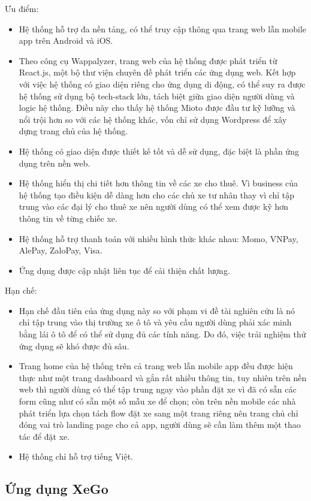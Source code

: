 \documentclass[../main.tex]{subfiles}
\begin{document}
	Ưu điểm:
	\begin{itemize}
		\item Hệ thống hỗ trợ đa nền tảng, có thể truy cập thông qua trang web lẫn mobile app trên Android và iOS.
		\item Theo công cụ Wappalyzer, trang web của hệ thống được phát triển từ React.js, một bộ thư viện chuyên đề
		phát triển các ứng dụng web. Kết hợp với việc hệ thống có giao diện riêng cho ứng dụng di động, có thể suy ra
		được hệ thống sử dụng bộ tech-stack lớn, tách biệt giữa giao diện người dùng và logic hệ thống. Điều này cho
		thấy hệ thống Mioto được đầu tư kỹ lưỡng và nổi trội hơn so với các hệ thống khác, vốn chỉ sử dụng Wordpress
		để xây dựng trang chủ của hệ thống.
		\item Hệ thống có giao diện được thiết kế tốt và dễ sử dụng, đặc biệt là phần ứng dụng trên nền web.
		\item Hệ thống hiển thị chi tiết hơn thông tin về các xe cho thuê. Vì business của hệ thống tạo điều kiện dễ
		dàng hơn cho các chủ xe tư nhân thay vì chỉ tập trung vào các đại lý cho thuê xe nên người dùng có thể xem
		được kỹ hơn thông tin về từng chiếc xe.
		\item Hệ thống hỗ trợ thanh toán với nhiều hình thức khác nhau: Momo, VNPay, AlePay, ZaloPay, Visa.
		\item Ứng dụng được cập nhật liên tục để cải thiện chất lượng.
	\end{itemize}

	Hạn chế:
	\begin{itemize}
		\item Hạn chế đầu tiên của ứng dụng này so với phạm vi đề tài nghiên cứu là nó chỉ tập trung vào thị trường
		xe ô tô và yêu cầu người dùng phải xác minh bằng lái ô tô để có thể sử dụng đủ các tính năng. Do đó, việc
		trải nghiệm thử ứng dụng sẽ khó được đủ sâu.
		\item Trang home của hệ thống trên cả trang web lẫn mobile app đều được hiện thực như một trang dashboard và
		gắn rất nhiều thông tin, tuy nhiên trên nền web thì người dùng có thể tập trung ngay vào phần đặt xe vì đã có
		sẵn các form cũng như có sẵn một số mẫu xe để chọn; còn trên nền mobile các nhà phát triển lựa chọn tách flow
		đặt xe sang một trang riêng nên trang chủ chỉ đóng vai trò landing page cho cả app, người dùng sẽ cần làm
		thêm một thao tác để đặt xe.
		\item Hệ thống chỉ hỗ trợ tiếng Việt.
	\end{itemize}

	\subsection{Ứng dụng XeGo}
\end{document}
